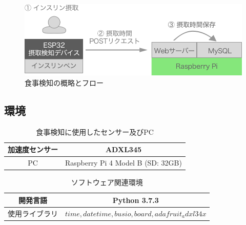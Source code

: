 \begin{figure}[htbp]
  \caption{食事検知の概略とフロー}
  \label{fig:insulin_injection_flow}
  \begin{center}
    \includegraphics[bb=0 0 1000 270,width=18cm]{assets/insulin_injection_flow.png}
  \end{center}
\end{figure}

\subsection{環境}

\begin{table}[htbp]
  \caption{食事検知に使用したセンサー及びPC}
  \label{tb:meal_detection_spec}
  \begin{center}
    \begin{tabular}{|c||c|}
      \hline
      加速度センサー & ADXL345 \\\hline
      PC & Raspberry Pi 4 Model B (SD: 32GB) \\\hline
    \end{tabular}
  \end{center}
\end{table}

\begin{table}[htbp]
  \caption{ソフトウェア関連環境}
  \label{tb:meal_detection_spec_sw}
  \begin{center}
    \begin{tabular}{|c||c|}
      \hline
      開発言語 & Python 3.7.3 \\\hline
      使用ライブラリ &  $ time, datetime, busio, board, adafruit_adxl34x $ \\\hline
    \end{tabular}
  \end{center}
\end{table}

